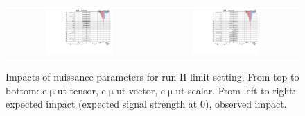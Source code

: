 \begin{figure}[tbh!]
\begin{center}
\begin{tabular}{cc}
   \includegraphics[width=0.48\textwidth]{figures/Appendix/Impact/Impact_ScalarU_expected0}&
  \includegraphics[width=0.48\textwidth]{figures/Appendix/Impact/Impact_ScalarU}\\
 \end{tabular}
 \caption{Impacts of nuissance parameters for run II limit setting. From top to bottom: e$\upmu$ut-tensor, e$\upmu$ut-vector, e$\upmu$ut-scalar. From left to right: expected impact (expected signal strength at 0), observed impact.}
 \label{fig:Impact0}
 \end{center}
\end{figure}


